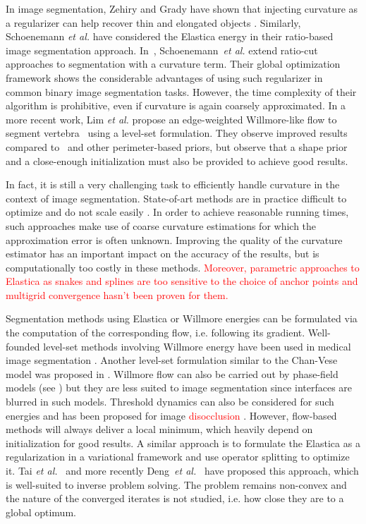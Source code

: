 \documentclass[smallextended]{svjour3}       %
\newcommand{\revision}[1]{\textcolor{red}{#1}}
\begin{document}
In image segmentation, Zehiry and Grady have shown that injecting
curvature as a regularizer can help recover thin and elongated objects
\cite{zehiry10fast}. Similarly, Schoenemann {\em et al.}
\cite{schoenemann09linear} have considered the Elastica energy in
their ratio-based image segmentation
approach. In~\cite{schoenemann2011elastic}, Schoenemann~{\em et al.}
extend ratio-cut approaches to segmentation with a curvature
term. Their global optimization framework shows the considerable
advantages of using such regularizer in common binary image
segmentation tasks.  However, the time complexity of their algorithm
is prohibitive, even if curvature is again coarsely
approximated.  In a more recent work, Lim {\em et al.} propose an
edge-weighted Willmore-like flow to segment
vertebra~\cite{lim2012introducing} using a level-set
formulation. They observe improved results compared
to~\cite{caseles97geodesic} and other perimeter-based priors, but
observe that a shape prior and a close-enough initialization must also be
provided to achieve good results.

In fact, it is still a very challenging task to efficiently handle
curvature in the context of image segmentation.  State-of-art methods
are in practice difficult to optimize and do not scale easily
\cite{zehiry10fast,schoenemann09linear,strandmark11globalframework,nieuwenhuis14efficient}. In
order to achieve reasonable running times, such approaches make use of
coarse curvature estimations for which the approximation error is
often unknown. Improving the quality of the curvature estimator has an
important impact on the accuracy of the results, but is
computationally too costly in these methods. \revision{Moreover, parametric approaches to Elastica  as snakes and splines are too sensitive to the choice of anchor points and multigrid convergence hasn't been proven for them.}

Segmentation methods using Elastica or Willmore energies can be
formulated via the computation of the corresponding flow,
i.e. following its gradient. Well-founded level-set methods involving
Willmore energy \cite{droske2004level} have been used in medical image
segmentation \cite{lim2012introducing}. Another level-set formulation
similar to the Chan-Vese model was proposed in
\cite{zhu2013image}. Willmore flow can also be carried out by
phase-field models (see \cite{bretin2015phase}) but they are less
suited to image segmentation since interfaces are blurred in such
models. Threshold dynamics can also be considered for such energies
\cite{esedoglu2008threshold} and has been proposed for image
\revision{disocclusion} \cite{esedoglu2005threshold}. However, flow-based methods
will always deliver a local minimum, which heavily depend on
initialization for good results. A similar approach is to formulate
the Elastica as a regularization in a variational framework and use
operator splitting to optimize it. Tai {\em et
  al.}~\cite{tai11elastica} and more recently Deng~{\em et
  al.}~\cite{deng2019new} have proposed this approach, which is
well-suited to inverse problem solving. The problem remains non-convex
and the nature of the converged iterates is not studied, i.e. how
close they are to a global optimum.
\end{document}
